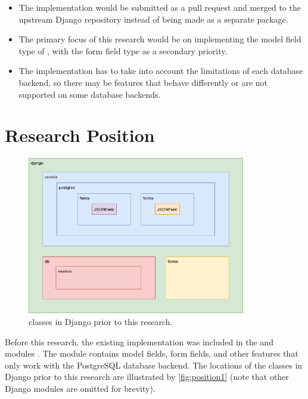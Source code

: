 \begin{itemize}
    \item The  implementation would be submitted as a pull
          request and merged to the upstream Django repository instead of being
          made as a separate package.
    \item The primary focus of this research would be on implementing the model
          field type of , with the form field type as a
          secondary priority.
    \item The  implementation has to take into account the
          limitations of each database backend, so there may be features that
          behave differently or are not supported on some database backends.
\end{itemize}

\section{Research Position}

\begin{figure}
	\centering
    \includegraphics[width=0.85\textwidth]{pics/position1.png}
	\caption{ classes in Django prior to this research.}
	\label{fig:position1}
\end{figure}

Before this research, the existing  implementation was included
in the  and
 modules \cite{django30_modeljsonfield,
django30_formjsonfield}. The  module contains
model fields, form fields, and other features that only work with the
PostgreSQL database backend. The locations of the  classes in
Django prior to this research are illustrated by \autoref{fig:position1} (note
that other Django modules are omitted for brevity).

